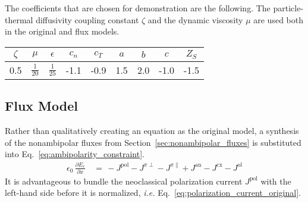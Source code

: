 The coefficients that are chosen for demonstration are the following.
The particle-thermal diffusivity coupling constant $\zeta$ and the dynamic viscosity $\mu$ are used both in the original and flux models.
\begin{table}[h] %
\centering
\begin{tabular}{cc|ccccccc}
	$\zeta$ & $\mu$ & $\epsilon$ & $c_n$ & $c_T$ & $a$ & $b$ & $c$ & $Z_S$ \\ \hline
	0.5 & $\frac{1}{20}$ & $\frac{1}{25}$ & -1.1 & -0.9 & 1.5 & 2.0 & -1.0 & -1.5
\end{tabular}
\end{table}

\subsection{Flux Model}\label{ssec:flux_Z_equation}
Rather than qualitatively creating an equation as the original model, a synthesis of the nonambipolar fluxes from Section~\ref{sec:nonambipolar_fluxes} is substituted into Eq.~\ref{eq:ambipolarity_constraint}.
\begin{align} %
	\epsilon_0 \, \frac{\partial E_r}{\partial x} \,&=\, -J^\text{pol}
		- J^{\pi\perp} - J^{\pi\parallel} + J^\text{an} - J^\text{cx}
		- J^\text{ol} \label{eq:current_sum}
\end{align}
It is advantageous to bundle the neoclassical polarization current $J^\text{pol}$ with the left-hand side before it is normalized, \emph{i.e.} Eq.~\ref{eq:polarization_current_original}.
